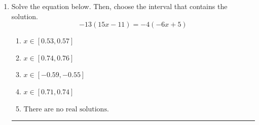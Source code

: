 \documentclass[14pt]{extbook}
\newcommand{\litem}[1]{\item#1\hspace*{-1cm}\rule{\textwidth}{0.4pt}}
\begin{document}
\begin{enumerate}
{\begin{enumerate}[label=\Alph*.]
\end{enumerate} }
\litem{
Solve the equation below. Then, choose the interval that contains the solution.\[ -13(15x -11) = -4(-6x + 5) \]\begin{enumerate}[label=\Alph*.]
\item \( x \in [0.53, 0.57] \)
\item \( x \in [0.74, 0.76] \)
\item \( x \in [-0.59, -0.55] \)
\item \( x \in [0.71, 0.74] \)
\item \( \text{There are no real solutions.} \)

\end{enumerate} }
\end{enumerate}
\end{document}

